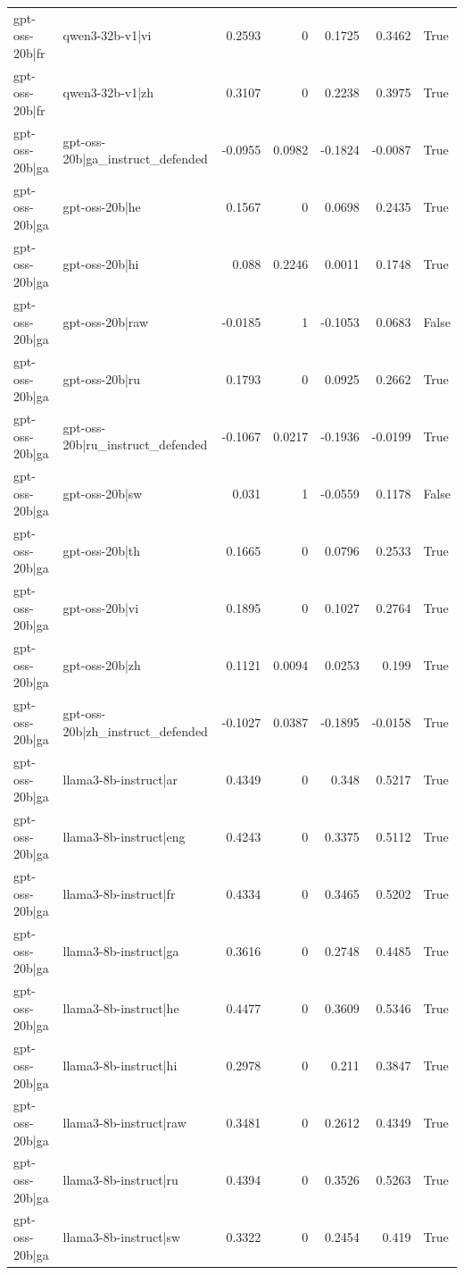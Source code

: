 \begin{table}
\begin{tabular}{l l r r r r l}
gpt-oss-20b|fr & qwen3-32b-v1|vi & 0.2593 & 0 & 0.1725 & 0.3462 & True \\
gpt-oss-20b|fr & qwen3-32b-v1|zh & 0.3107 & 0 & 0.2238 & 0.3975 & True \\
gpt-oss-20b|ga & gpt-oss-20b|ga_instruct_defended & -0.0955 & 0.0982 & -0.1824 & -0.0087 & True \\
gpt-oss-20b|ga & gpt-oss-20b|he & 0.1567 & 0 & 0.0698 & 0.2435 & True \\
gpt-oss-20b|ga & gpt-oss-20b|hi & 0.088 & 0.2246 & 0.0011 & 0.1748 & True \\
gpt-oss-20b|ga & gpt-oss-20b|raw & -0.0185 & 1 & -0.1053 & 0.0683 & False \\
gpt-oss-20b|ga & gpt-oss-20b|ru & 0.1793 & 0 & 0.0925 & 0.2662 & True \\
gpt-oss-20b|ga & gpt-oss-20b|ru_instruct_defended & -0.1067 & 0.0217 & -0.1936 & -0.0199 & True \\
gpt-oss-20b|ga & gpt-oss-20b|sw & 0.031 & 1 & -0.0559 & 0.1178 & False \\
gpt-oss-20b|ga & gpt-oss-20b|th & 0.1665 & 0 & 0.0796 & 0.2533 & True \\
gpt-oss-20b|ga & gpt-oss-20b|vi & 0.1895 & 0 & 0.1027 & 0.2764 & True \\
gpt-oss-20b|ga & gpt-oss-20b|zh & 0.1121 & 0.0094 & 0.0253 & 0.199 & True \\
gpt-oss-20b|ga & gpt-oss-20b|zh_instruct_defended & -0.1027 & 0.0387 & -0.1895 & -0.0158 & True \\
gpt-oss-20b|ga & llama3-8b-instruct|ar & 0.4349 & 0 & 0.348 & 0.5217 & True \\
gpt-oss-20b|ga & llama3-8b-instruct|eng & 0.4243 & 0 & 0.3375 & 0.5112 & True \\
gpt-oss-20b|ga & llama3-8b-instruct|fr & 0.4334 & 0 & 0.3465 & 0.5202 & True \\
gpt-oss-20b|ga & llama3-8b-instruct|ga & 0.3616 & 0 & 0.2748 & 0.4485 & True \\
gpt-oss-20b|ga & llama3-8b-instruct|he & 0.4477 & 0 & 0.3609 & 0.5346 & True \\
gpt-oss-20b|ga & llama3-8b-instruct|hi & 0.2978 & 0 & 0.211 & 0.3847 & True \\
gpt-oss-20b|ga & llama3-8b-instruct|raw & 0.3481 & 0 & 0.2612 & 0.4349 & True \\
gpt-oss-20b|ga & llama3-8b-instruct|ru & 0.4394 & 0 & 0.3526 & 0.5263 & True \\
gpt-oss-20b|ga & llama3-8b-instruct|sw & 0.3322 & 0 & 0.2454 & 0.419 & True \\

\end{tabular}
\end{table}
